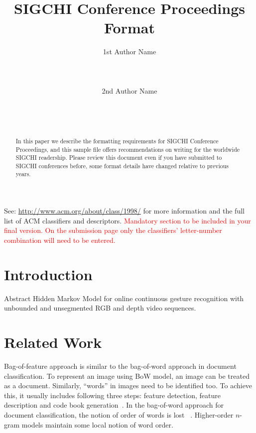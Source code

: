 \documentclass{sigchi}
\begin{document}
\title{SIGCHI Conference Proceedings Format}

\author{
  \alignauthor 1st Author Name\\
    \\
    \\
    \\
  \alignauthor 2nd Author Name\\
    \\
    \\
    \\
}

\maketitle

\begin{abstract}
In this paper we describe the formatting requirements for
SIGCHI Conference Proceedings, and this sample file
offers recommendations on writing for the worldwide
SIGCHI readership. Please review this document even if
you have submitted to SIGCHI conferences before, some
format details have changed relative to previous years.
\end{abstract}



See: \url{http://www.acm.org/about/class/1998/}
for more information and the full list of ACM classifiers
and descriptors. 
\textcolor{red}{Mandatory section to be included in your
final version. On the submission page only the classifiers'
letter-number combination will need to be entered.}

\section{Introduction}

Abstract Hidden Markov Model for online continuous gesture recognition with
unbounded and unsegmented RGB and depth video sequences. 

\section{Related Work}
Bag-of-feature approach is similar to the bag-of-word approach in document classification. 
To represent an image using BoW model, an image can be treated as a document. Similarly,
``words'' in images need to be identified too. To achieve this, it usually includes
following three steps: feature detection, feature description and code book generation~\cite{fei2005}.
In the bag-of-word approach for document classification, the notion of order of words is lost
~\cite{Russell2003}. Higher-order $n$-gram models maintain some local notion of word order.
\end{document}
